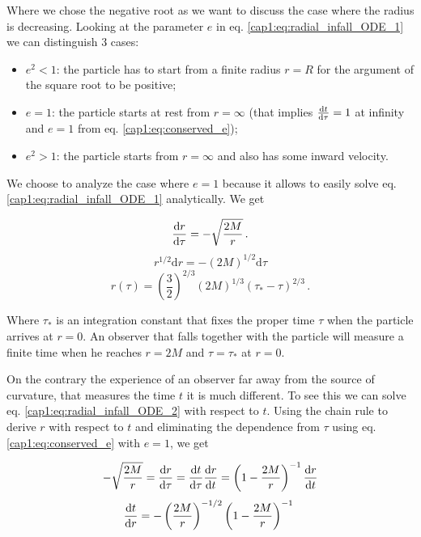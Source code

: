 Where we chose the negative root as we want to discuss the case where the radius
is decreasing.
Looking at the parameter $e$ in eq. \ref{cap1:eq:radial_infall_ODE_1} we can
distinguish 3 cases:

\begin{itemize}
    \item $e^2 < 1$: the particle has to start from a finite radius $r = R$
        for the argument of the square root to be positive;
    \item $e = 1$: the particle starts at rest from $r = \infty$ (that implies
        $\dv{t}{\tau} = 1$ at infinity and $e = 1$ from eq.
        \ref{cap1:eq:conserved_e});
    \item $e^2 > 1$: the particle starts from $r = \infty$ and also has some
        inward velocity.
\end{itemize}

We choose to analyze the case where $e = 1$ because it allows to easily solve
eq. \ref{cap1:eq:radial_infall_ODE_1} analytically.
We get

\begin{equation}
    \dv{r}{\tau} = - \sqrt{\frac{2 M}{r}} \, .
    \label{cap1:eq:radial_infall_ODE_2}
\end{equation}
\begin{equation*}
    r^{1/2} \mathrm{d}r = -(2M)^{1/2} \mathrm{d}\tau
\end{equation*}
\begin{equation}
    r(\tau) = \left(\frac{3}{2}\right)^{2/3}
    (2M)^{1/3} (\tau_* - \tau)^{2/3} \, .
    \label{cap1:eq:radial_infall_r_of_tau}
\end{equation}

Where $\tau_*$ is an integration constant that fixes the proper time $\tau$
when the particle arrives at $r = 0$.
An observer that falls together with the particle will measure a finite time
when he reaches $r = 2M$ and $\tau = \tau_*$ at $r = 0$.

On the contrary the experience of an observer far away from the source of
curvature, that measures the \Sh time $t$ it is much different.
To see this we can solve eq. \ref{cap1:eq:radial_infall_ODE_2} with respect to
$t$.
Using the chain rule to derive $r$ with respect to $t$ and eliminating the
dependence from $\tau$ using eq. \ref{cap1:eq:conserved_e} with $e = 1$, we get

\begin{align*}
    - \sqrt{\frac{2 M}{r}} = \dv{r}{\tau} = \dv{t}{\tau} \dv{r}{t}
    = \left(1 - \frac{2M}{r} \right)^{-1} \dv{r}{t}
\end{align*}
\begin{equation*}
    \dv{t}{r} = - \left(\frac{2 M}{r}\right)^{-1/2}
    \left(1 - \frac{2M}{r} \right)^{-1} \,  \, 
\end{equation*}

